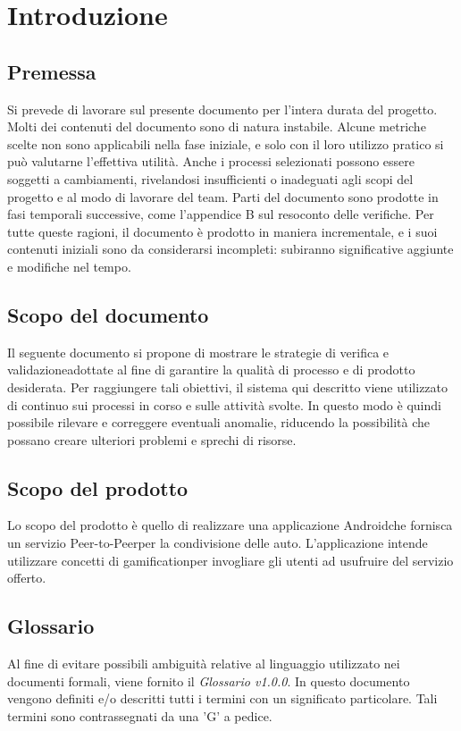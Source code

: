 \section{Introduzione}
\subsection{Premessa}
Si prevede di lavorare sul presente documento per l'intera durata del progetto. 
Molti dei contenuti del documento sono di natura instabile. \newline
Alcune metriche scelte non sono applicabili nella fase iniziale, e solo con il loro utilizzo pratico si può valutarne l'effettiva utilità. Anche i processi selezionati possono essere soggetti a cambiamenti, rivelandosi insufficienti o inadeguati agli scopi del progetto e al modo di lavorare del team.\newline 
Parti del documento sono prodotte in fasi temporali successive, come l'appendice B sul resoconto delle verifiche.\newline 
Per tutte queste ragioni, il documento è prodotto in maniera incrementale, e i suoi contenuti iniziali sono da considerarsi incompleti: subiranno significative aggiunte e modifiche nel tempo.
\subsection{Scopo del documento}
Il seguente documento si propone di mostrare le strategie di verifica e validazione\glosp adottate al fine di garantire la qualità di processo e di prodotto desiderata. \newline
Per raggiungere tali obiettivi, il sistema qui descritto viene utilizzato di continuo sui processi in corso e sulle attività svolte. In questo modo è quindi possibile rilevare e correggere eventuali anomalie, riducendo la possibilità che possano creare ulteriori problemi e sprechi di risorse. 
\subsection{Scopo del prodotto}
Lo scopo del prodotto è quello di realizzare una applicazione Android\glosp che fornisca un servizio Peer-to-Peer\glosp per la condivisione delle auto. L'applicazione intende utilizzare concetti di gamification\glosp per invogliare gli utenti ad usufruire del servizio offerto.
\subsection{Glossario}
Al fine di evitare possibili ambiguità relative al linguaggio utilizzato nei documenti formali, viene fornito il \textit{Glossario v1.0.0}. In questo documento vengono definiti e/o descritti tutti i termini con un significato particolare. Tali termini sono contrassegnati da una 'G' a pedice.
